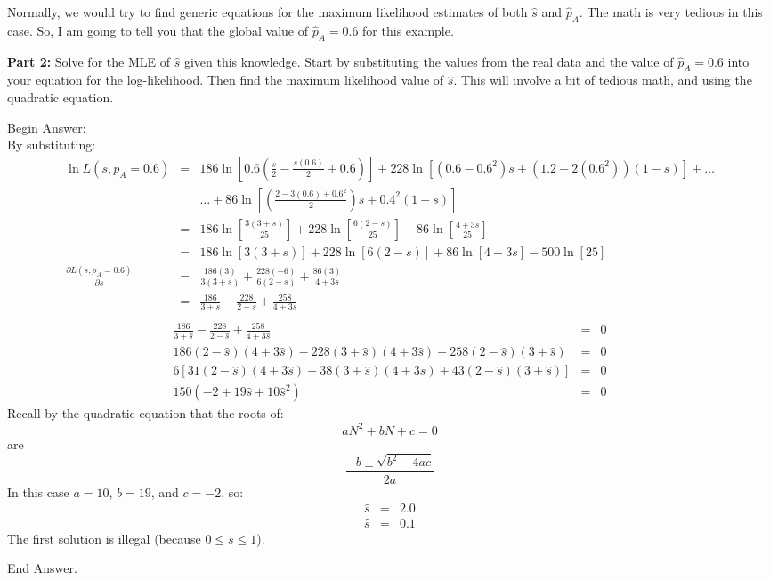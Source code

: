 \documentclass[11pt]{article}
\newcommand{\answer}[1]{{\color{red}\sc Begin Answer:\\}#1{\par\color{red}\sc End Answer.\\}}
\begin{document}
Normally, we would try to find generic equations for the maximum likelihood estimates of both $\hat s$ and $\hat p_A$.
The math is very tedious in this case.  So, I am going to tell you that the global value of $\hat p_A = 0.6$ for this example. 
\begin{compactenum}
	\item[{\bf Part 2:}] Solve for the MLE of $\hat s$ given this knowledge.  Start  by substituting the values from the real data and the value of $\hat p_A=0.6$ into your equation for the log-likelihood. Then find the maximum likelihood value of $\hat s$.  This will involve a bit of tedious math, and using the quadratic equation.
\end{compactenum}
\answer{
By substituting:
\begin{eqnarray*}
	\ln L (s, p_A=0.6) & =  & 186\ln\left[0.6\left(\frac{s}{2} - \frac{s(0.6)}{2} + 0.6\right)\right] + 228\ln\left[(0.6 - 0.6^2)s + (1.2  - 2(0.6^2))(1-s)\right] + \ldots \\
 & & \ldots + 86\ln\left[\left(\frac{2 - 3(0.6) + 0.6^2}{2}\right)s + 0.4^2(1-s)\right] \\
 & =  & 186\ln\left[\frac{3(3+s)}{25}\right] + 228\ln\left[\frac{6(2-s)}{25}\right] +  86\ln\left[\frac{4 + 3s}{25}\right]\\
 & =  & 186\ln\left[3(3+s)\right] + 228\ln\left[6(2-s)\right] +  86\ln\left[4 + 3s\right] - 500 \ln[25] \\
 \frac{\partial L (s, p_A=0.6)}{\partial s} & = & \frac{186(3)}{3(3+s)} + \frac{228(-6)}{6(2-s)} + \frac{86(3)}{4 + 3s} \\
 & = & \frac{186}{3+s} - \frac{228}{2-s} + \frac{258}{4 + 3s} \\
\end{eqnarray*}
\begin{eqnarray*}
\frac{186}{3 + \hat s} - \frac{228}{2 - \hat s} + \frac{258}{4 + 3\hat s} & = & 0 \\
186(2 - \hat s)(4 + 3\hat s) - 228(3 + \hat s)(4 + 3\hat s) + 258(2 - \hat s)(3 + \hat s) & = & 0 \\
6\left[31(2 - \hat s)(4 + 3\hat s) - 38(3 + \hat s)(4 + 3\hat s) + 43(2 - \hat s)(3 + \hat s)\right] & = & 0 \\
150 (-2 + 19 \hat s + 10 \hat s^2) & = & 0
\end{eqnarray*}
Recall by the quadratic equation that the roots of:
$$ aN^2 + bN + c = 0 $$
are
$$ \frac{-b \pm \sqrt{b^2-4ac}}{2a}$$
In this case $a=10$, $b=19$, and $c=-2$, so:
\begin{eqnarray*}
	\hat s & = &2.0 \\
	\hat s & = & 0.1
\end{eqnarray*}
The first solution is illegal (because $0\leq s \leq 1$).
}
\end{document}
